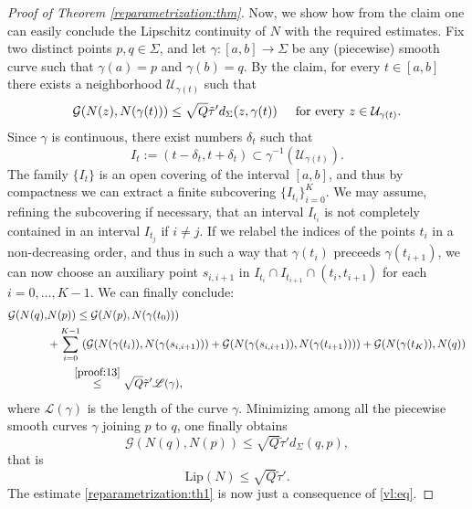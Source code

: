 \documentclass[a4paper,11pt,reqno]{amsart}
\theoremstyle{definition}
\numberwithin{equation}{section}
\numberwithin{subsection}{section}
\newcommand{\U}{\mathcal{U}}
\newcommand{\G}{\mathcal{G}}
\newcommand{\Lip}{\mathrm{Lip}}
\begin{document}
\begin{proof}[Proof of Theorem \ref{reparametrization:thm}]
Now, we show how from the claim one can easily conclude the Lipschitz continuity of $N$ with the required estimates. Fix two distinct points $p,q \in \Sigma$, and let $\gamma \colon \left[ a, b \right] \to \Sigma$ be any (piecewise) smooth curve such that $\gamma(a) = p$ and $\gamma(b) = q$. By the claim, for every $t \in \left[ a, b \right]$ there exists a neighborhood $\U_{\gamma(t)}$ such that
\begin{equation} \label{proof:12}
\G(N(z), N(\gamma(t))) \leq \sqrt{Q} \tilde{\tau}' d_{\Sigma}(z, \gamma(t)) \hspace{0.5cm} \mbox{for every } z \in \U_{\gamma(t)}.
\end{equation}
Since $\gamma$ is continuous, there exist numbers $\delta_{t}$ such that
\begin{equation} \label{proof:13}
I_{t} := \left( t - \delta_{t}, t + \delta_{t} \right) \subset \gamma^{-1}(\U_{\gamma(t)}).
\end{equation}
The family $\lbrace I_{t} \rbrace$ is an open covering of the interval $\left[ a,b \right]$, and thus by compactness we can extract a finite subcovering $\lbrace I_{t_i} \rbrace_{i=0}^{K}$. We may assume, refining the subcovering if necessary, that an interval $I_{t_i}$ is not completely contained in an interval $I_{t_j}$ if $i \neq j$. If we relabel the indices of the points $t_{i}$ in a non-decreasing order, and thus in such a way that $\gamma(t_{i})$ preceeds $\gamma(t_{i+1})$, we can now choose an auxiliary point $s_{i,i+1}$ in $I_{t_i} \cap I_{t_{i+1}} \cap \left( t_{i}, t_{i+1} \right)$ for each $i = 0,\dots,K-1$. We can finally conclude:
\begin{equation} \label{proof:14}
\begin{split}
\G(N(q), &N(p)) \leq \G(N(p), N(\gamma(t_{0}))) \\
&+ \sum_{i=0}^{K-1} \left( \G(N(\gamma(t_{i})), N(\gamma(s_{i,i+1}))) + \G(N(\gamma(s_{i,i+1})), N(\gamma(t_{i+1}))) \right) + \G(N(\gamma(t_K)), N(q)) \\
& \quad \quad \, \overset{\eqref{proof:13}}{\leq} \sqrt{Q} \tilde{\tau}' \mathscr{L}(\gamma),
\end{split}
\end{equation} 
where $\mathscr{L}(\gamma)$ is the length of the curve $\gamma$. Minimizing among all the piecewise smooth curves $\gamma$ joining $p$ to $q$, one finally obtains
\begin{equation} \label{proof:15}
\G(N(q), N(p)) \leq \sqrt{Q} \tilde{\tau}' d_{\Sigma}(q,p), 
\end{equation}
that is
\begin{equation} \label{proof:16}
\Lip(N) \leq \sqrt{Q} \tilde{\tau}'.
\end{equation}
The estimate \eqref{reparametrization:th1} is now just a consequence of \eqref{vl:eq}.


\end{proof}
\end{document}

